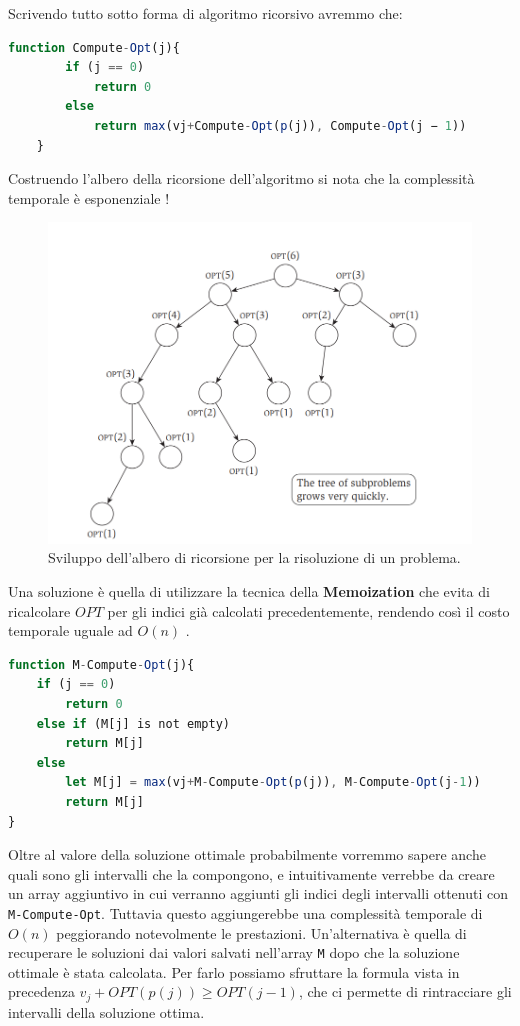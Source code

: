 Scrivendo tutto sotto forma di algoritmo ricorsivo avremmo che:

\begin{lstlisting}[language=Javascript]
    function Compute-Opt(j){
        if (j == 0)
            return 0
        else
            return max(vj+Compute-Opt(p(j)), Compute-Opt(j − 1))
    }
\end{lstlisting}

Costruendo l'albero della ricorsione dell'algoritmo si nota che la complessità
temporale è esponenziale  !

\begin{figure}[H]
    \centering
    \includegraphics[width=12cm, keepaspectratio]{capitoli/imgs/opt_albero.png}
    \caption{Sviluppo dell'albero di ricorsione per la risoluzione di un problema.}
\end{figure}

\pagebreak

Una soluzione è quella di utilizzare la tecnica della \textbf{Memoization} che evita
di ricalcolare $OPT$ per gli indici già calcolati precedentemente, rendendo così
il costo temporale uguale ad $O(n)$ .

\begin{lstlisting}[language=Javascript]
function M-Compute-Opt(j){
    if (j == 0)
        return 0
    else if (M[j] is not empty)
        return M[j]
    else
        let M[j] = max(vj+M-Compute-Opt(p(j)), M-Compute-Opt(j-1))
        return M[j]
}
\end{lstlisting}

Oltre al valore della soluzione ottimale probabilmente vorremmo sapere anche
quali sono gli intervalli che la compongono, e intuitivamente verrebbe da creare
un array aggiuntivo in cui verranno aggiunti gli indici degli intervalli
ottenuti con \verb|M-Compute-Opt|. Tuttavia questo aggiungerebbe una complessità
temporale di $O(n)$ peggiorando notevolmente le prestazioni. Un'alternativa è
quella di recuperare le soluzioni dai valori salvati nell'array \verb|M| dopo che la
soluzione ottimale è stata calcolata. Per farlo possiamo sfruttare la formula
vista in precedenza $v_j + OPT(p(j)) \geq OPT(j-1)$, che ci permette di
rintracciare gli intervalli della soluzione ottima.

